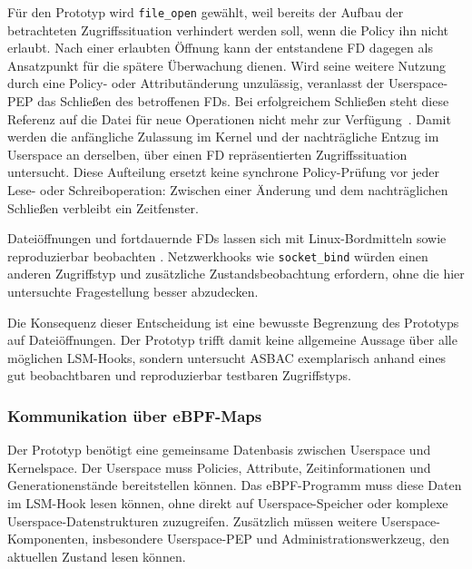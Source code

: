 Für den Prototyp wird \texttt{file\_open} gewählt, weil bereits der Aufbau der betrachteten Zugriffssituation verhindert werden soll, wenn die Policy ihn nicht erlaubt.
Nach einer erlaubten Öffnung kann der entstandene FD dagegen als Ansatzpunkt für die spätere Überwachung dienen.
Wird seine weitere Nutzung durch eine Policy- oder Attributänderung unzulässig, veranlasst der Userspace-PEP das Schließen des betroffenen FDs.
Bei erfolgreichem Schließen steht diese Referenz auf die Datei für neue Operationen nicht mehr zur Verfügung~\citep{manClose}.
Damit werden die anfängliche Zulassung im Kernel und der nachträgliche Entzug im Userspace an derselben, über einen FD repräsentierten Zugriffssituation untersucht.
Diese Aufteilung ersetzt keine synchrone Policy-Prüfung vor jeder Lese- oder Schreiboperation: Zwischen einer Änderung und dem nachträglichen Schließen verbleibt ein Zeitfenster.

Dateiöffnungen und fortdauernde FDs lassen sich mit Linux-Bordmitteln sowie  reproduzierbar beobachten \citep{manProcPidFd}. Netzwerkhooks wie \texttt{socket\_bind} würden einen anderen Zugriffstyp und zusätzliche Zustandsbeobachtung erfordern, ohne die hier untersuchte Fragestellung besser abzudecken.

Die Konsequenz dieser Entscheidung ist eine bewusste Begrenzung des Prototyps auf Dateiöffnungen.
Der Prototyp trifft damit keine allgemeine Aussage über alle möglichen LSM-Hooks, sondern untersucht ASBAC exemplarisch anhand eines gut beobachtbaren und reproduzierbar testbaren Zugriffstyps.



\subsubsection{Kommunikation über eBPF-Maps}
Der Prototyp benötigt eine gemeinsame Datenbasis zwischen Userspace und Kernelspace.
Der Userspace muss Policies, Attribute, Zeitinformationen und Generationenstände bereitstellen können.
Das eBPF-Programm muss diese Daten im LSM-Hook lesen können, ohne direkt auf Userspace-Speicher oder komplexe Userspace-Datenstrukturen zuzugreifen.
Zusätzlich müssen weitere Userspace-Komponenten, insbesondere Userspace-PEP und Administrationswerkzeug, den aktuellen Zustand lesen können.

